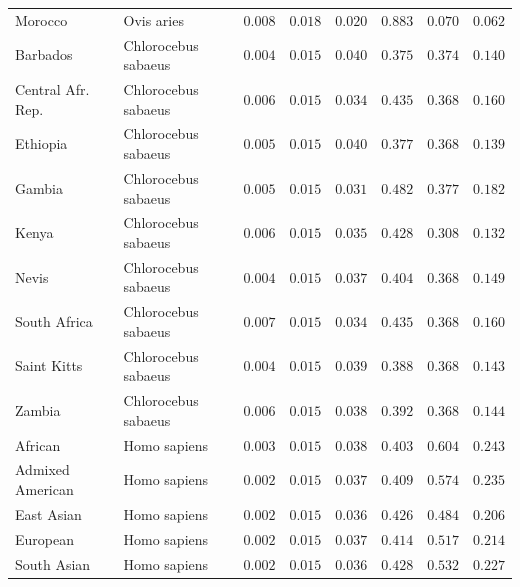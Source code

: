 \documentclass{article}
\begin{document}
\begin{center}
\begin{longtable*}{|l|l|r|r|r|r|r|r|}
            Morocco & Ovis aries & $ 0.008$ & $ 0.018$ & $ 0.020$ & $ 0.883$ & $ 0.070$ & $ 0.062$ \\
            Barbados & Chlorocebus sabaeus & $ 0.004$ & $ 0.015$ & $ 0.040$ & $ 0.375$ & $ 0.374$ & $ 0.140$ \\
            Central Afr. Rep. & Chlorocebus sabaeus & $ 0.006$ & $ 0.015$ & $ 0.034$ & $ 0.435$ & $ 0.368$ & $ 0.160$ \\
            Ethiopia & Chlorocebus sabaeus & $ 0.005$ & $ 0.015$ & $ 0.040$ & $ 0.377$ & $ 0.368$ & $ 0.139$ \\
            Gambia & Chlorocebus sabaeus & $ 0.005$ & $ 0.015$ & $ 0.031$ & $ 0.482$ & $ 0.377$ & $ 0.182$ \\
            Kenya & Chlorocebus sabaeus & $ 0.006$ & $ 0.015$ & $ 0.035$ & $ 0.428$ & $ 0.308$ & $ 0.132$ \\
            Nevis & Chlorocebus sabaeus & $ 0.004$ & $ 0.015$ & $ 0.037$ & $ 0.404$ & $ 0.368$ & $ 0.149$ \\
            South Africa & Chlorocebus sabaeus & $ 0.007$ & $ 0.015$ & $ 0.034$ & $ 0.435$ & $ 0.368$ & $ 0.160$ \\
            Saint Kitts & Chlorocebus sabaeus & $ 0.004$ & $ 0.015$ & $ 0.039$ & $ 0.388$ & $ 0.368$ & $ 0.143$ \\
            Zambia & Chlorocebus sabaeus & $ 0.006$ & $ 0.015$ & $ 0.038$ & $ 0.392$ & $ 0.368$ & $ 0.144$ \\
            African & Homo sapiens & $ 0.003$ & $ 0.015$ & $ 0.038$ & $ 0.403$ & $ 0.604$ & $ 0.243$ \\
            Admixed American & Homo sapiens & $ 0.002$ & $ 0.015$ & $ 0.037$ & $ 0.409$ & $ 0.574$ & $ 0.235$ \\
            East Asian & Homo sapiens & $ 0.002$ & $ 0.015$ & $ 0.036$ & $ 0.426$ & $ 0.484$ & $ 0.206$ \\
            European & Homo sapiens & $ 0.002$ & $ 0.015$ & $ 0.037$ & $ 0.414$ & $ 0.517$ & $ 0.214$ \\
            South Asian & Homo sapiens & $ 0.002$ & $ 0.015$ & $ 0.036$ & $ 0.428$ & $ 0.532$ & $ 0.227$ \\
        \end{longtable*}
    \end{center}
\end{document}
